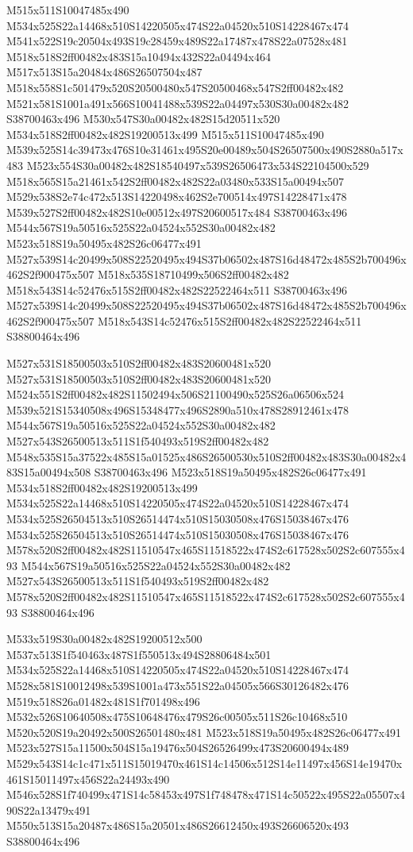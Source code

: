 \documentclass{article}
\begin{document}
\begin{multicols}{2}
M515x511S10047485x490 M534x525S22a14468x510S14220505x474S22a04520x510S14228467x474 M541x522S19c20504x493S19c28459x489S22a17487x478S22a07528x481 M518x518S2ff00482x483S15a10494x432S22a04494x464 M517x513S15a20484x486S26507504x487 M518x558S1c501479x520S20500480x547S20500468x547S2ff00482x482 M521x581S1001a491x566S10041488x539S22a04497x530S30a00482x482 S38700463x496 M530x547S30a00482x482S15d20511x520 M534x518S2ff00482x482S19200513x499 M515x511S10047485x490 M539x525S14c39473x476S10e31461x495S20e00489x504S26507500x490S2880a517x483 M523x554S30a00482x482S18540497x539S26506473x534S22104500x529 M518x565S15a21461x542S2ff00482x482S22a03480x533S15a00494x507 M529x538S2e74c472x513S14220498x462S2e700514x497S14228471x478 M539x527S2ff00482x482S10e00512x497S20600517x484 S38700463x496 M544x567S19a50516x525S22a04524x552S30a00482x482 M523x518S19a50495x482S26c06477x491 M527x539S14c20499x508S22520495x494S37b06502x487S16d48472x485S2b700496x462S2f900475x507 M518x535S18710499x506S2ff00482x482 M518x543S14c52476x515S2ff00482x482S22522464x511 S38700463x496 M527x539S14c20499x508S22520495x494S37b06502x487S16d48472x485S2b700496x462S2f900475x507 M518x543S14c52476x515S2ff00482x482S22522464x511 S38800464x496

M527x531S18500503x510S2ff00482x483S20600481x520 M527x531S18500503x510S2ff00482x483S20600481x520 M524x551S2ff00482x482S11502494x506S21100490x525S26a06506x524 M539x521S15340508x496S15348477x496S2890a510x478S28912461x478 M544x567S19a50516x525S22a04524x552S30a00482x482 M527x543S26500513x511S1f540493x519S2ff00482x482 M548x535S15a37522x485S15a01525x486S26500530x510S2ff00482x483S30a00482x483S15a00494x508 S38700463x496 M523x518S19a50495x482S26c06477x491 M534x518S2ff00482x482S19200513x499 M534x525S22a14468x510S14220505x474S22a04520x510S14228467x474 M534x525S26504513x510S26514474x510S15030508x476S15038467x476 M534x525S26504513x510S26514474x510S15030508x476S15038467x476 M578x520S2ff00482x482S11510547x465S11518522x474S2c617528x502S2c607555x493 M544x567S19a50516x525S22a04524x552S30a00482x482 M527x543S26500513x511S1f540493x519S2ff00482x482 M578x520S2ff00482x482S11510547x465S11518522x474S2c617528x502S2c607555x493 S38800464x496

M533x519S30a00482x482S19200512x500 M537x513S1f540463x487S1f550513x494S28806484x501 M534x525S22a14468x510S14220505x474S22a04520x510S14228467x474 M528x581S10012498x539S1001a473x551S22a04505x566S30126482x476 M519x518S26a01482x481S1f701498x496 M532x526S10640508x475S10648476x479S26c00505x511S26c10468x510 M520x520S19a20492x500S26501480x481 M523x518S19a50495x482S26c06477x491 M523x527S15a11500x504S15a19476x504S26526499x473S20600494x489 M529x543S14c1c471x511S15019470x461S14c14506x512S14e11497x456S14e19470x461S15011497x456S22a24493x490 M546x528S1f740499x471S14c58453x497S1f748478x471S14c50522x495S22a05507x490S22a13479x491 M550x513S15a20487x486S15a20501x486S26612450x493S26606520x493 S38800464x496


\end{multicols}
\end{document}
